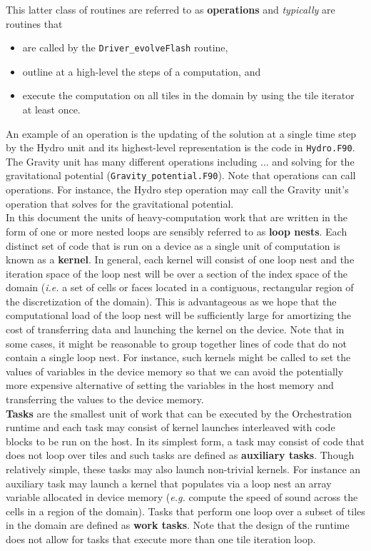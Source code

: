 \documentclass{article}
\begin{document}
This latter class of routines are referred to as \textbf{operations} and
\textit{typically} are routines that
\begin{itemize}
\item{are called by the \texttt{Driver\_evolveFlash} routine,}
\item{outline at a high-level the steps of a computation, and}
\item{execute the computation on all tiles in the domain by using the tile
iterator at least once.}
\end{itemize}
An example of an
operation is the updating of the solution at a single time step by the Hydro
unit and its highest-level representation is the code in \texttt{Hydro.F90}.
The Gravity unit has many different operations including ... and solving for the
gravitational potential (\texttt{Gravity\_potential.F90}).  Note that operations
can call operations.  For instance, the Hydro step operation may call the
Gravity unit's operation that solves for the gravitational potential.\\

In this document the units of heavy-computation work that are written in the
form of one or more nested loops are sensibly referred to as \textbf{loop
nests}.  Each distinct set of code that is run on a device as a single unit of
computation is known as a \textbf{kernel}.  In general, each kernel will consist
of one loop nest and the iteration space of the loop nest will be over a section
of the index space of the domain (\textit{i.e.} a set of cells or faces located
in a contiguous, rectangular region of the discretization of the domain).  This
is advantageous as we hope that the computational load of the loop nest will be
sufficiently large for amortizing the cost of transferring data and launching
the kernel on the device.  Note that in some cases, it might be reasonable to
group together lines of code that do not contain a single loop nest.  For
instance, such kernels might be called to set the values of variables in the
device memory so that we can avoid the potentially more expensive alternative of
setting the variables in the host memory and transferring the values to the device
memory.\\

\textbf{Tasks} are the smallest unit of work that can be executed by the
Orchestration runtime and each task may consist of kernel launches interleaved
with code blocks to be run on the host.  In its simplest form, a task may
consist of code that does not loop over tiles and such tasks are defined as
\textbf{auxiliary tasks}.  Though relatively simple, these tasks may also launch
non-trivial kernels.  For instance an auxiliary task may launch a kernel that
populates via a loop nest an array variable allocated in device memory
(\textit{e.g.} compute the speed of sound across the cells in a region of the
domain).  Tasks that perform one loop over a subset of tiles in the domain are
defined as \textbf{work tasks}.  Note that the design of the runtime does not
allow for tasks that execute more than one tile iteration loop.\\
\end{document}
